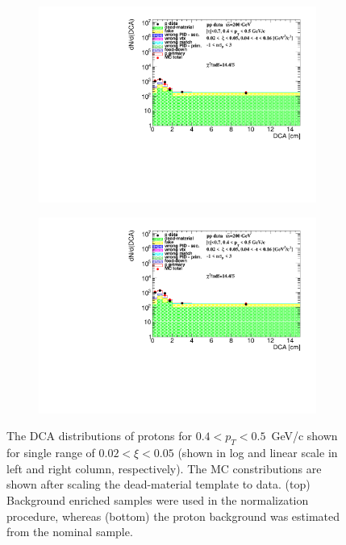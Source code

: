 \begin{figure}[h!]
\begin{subfigure}{.49\textwidth}
	\end{subfigure}
	\begin{subfigure}{.49\textwidth}
		\includegraphics[width=\linewidth, page=4]{chapters/chrgSTAR/img/DCAproton/background_p_0.pdf}
	\end{subfigure}
	\begin{subfigure}{.49\textwidth}
		\includegraphics[width=\linewidth, page=5]{chapters/chrgSTAR/img/DCAproton/background_p_0.pdf}
	\end{subfigure}
	\caption{The $\textrm{DCA}$ distributions of protons for $0.4<p_T<0.5$~GeV/c shown for single range of $0.02<\xi<0.05$ (shown in log and linear scale in left and right column, respectively). The MC  constributions are shown after scaling the dead-material template  to data. (top) Background enriched samples were used in the normalization procedure, whereas (bottom) the proton background was estimated from the nominal sample.}
	\label{fig:bkg_proton}
\end{figure}

